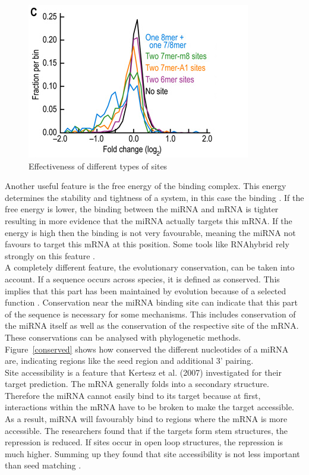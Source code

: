 \documentclass[11pt,  a4paper]{report}
\begin{document}
\begin{figure}[h]
\centering
\includegraphics[scale=0.7]{results/site_3addi.png}
\caption{Effectiveness of different types of sites}
\label{types}
\end{figure}

Another useful feature is the free energy of the binding complex. This energy determines the stability and tightness of a  system, in this case the binding \cite{Peterson}. If the free energy is lower, the binding between the miRNA and mRNA is tighter resulting in more evidence that the miRNA actually targets this mRNA. If the energy is high then the binding is not very favourable, meaning the miRNA not favours to target this mRNA at this position. Some tools like RNAhybrid rely strongly on this feature \cite{Rehmsmeier}. \\

A completely different feature, the evolutionary conservation, can be taken into account. If a sequence occurs across species, it is defined as conserved. This implies that this part has been maintained by evolution because of a selected function \cite{Peterson}. Conservation near the miRNA binding site can indicate that this part of the sequence is necessary for some mechanisms. This includes conservation of the miRNA itself as well as the conservation of the respective site of the mRNA. These conservations can be analysed with phylogenetic methods. Figure~\ref{conserved} shows how conserved the different nucleotides of a miRNA are, indicating regions like the seed region and additional 3' pairing. \\

Site accessibility is a feature that Kertesz et al. (2007) investigated for their target prediction. The mRNA generally folds into a secondary structure. Therefore the miRNA cannot easily bind to its target because at first, interactions within the mRNA have to be broken to make the target accessible. As a result, miRNA will favourably bind to regions where the mRNA is more accessible. The researchers found that if the targets form stem structures, the repression is reduced. If sites occur in open loop structures, the repression is much higher. Summing up they found that site accessibility is not less important than seed matching \cite{Kertesz}. \\
\end{document}
